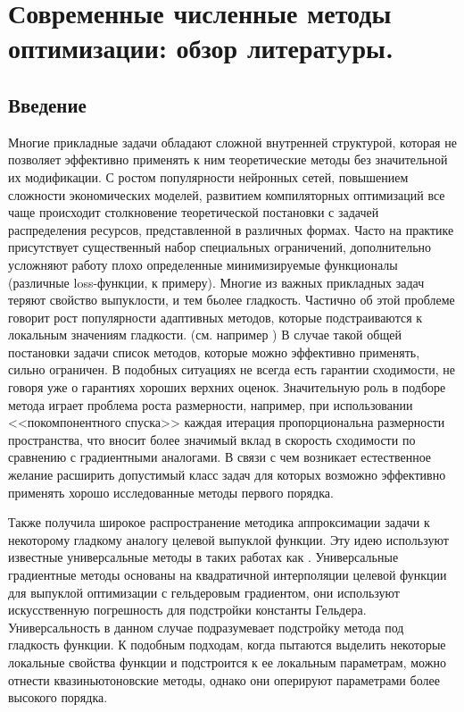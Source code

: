 \chapter{Современные численные методы оптимизации: обзор литератyры.}\label{ch:ch1}

\section{Введение}\label{sec:ch1/sec1}

  Многие прикладные задачи обладают сложной внутренней структурой, которая не позволяет эффективно применять к ним теоретические методы без значительной их модификации. С ростом популярности нейронных сетей, повышением сложности экономических моделей, развитием компиляторных оптимизаций все чаще происходит столкновение теоретической постановки с задачей распределения ресурсов, представленной в различных формах. Часто на практике присутствует существенный набор специальных ограничений, дополнительно усложняют работу плохо определенные минимизируемые функционалы (различные loss-функции, к примеру). Многие из важных прикладных задач теряют свойство выпуклости, и тем бьолее гладкость. Частично об этой проблеме говорит рост популярности адаптивных методов, которые подстраиваются к локальным значениям гладкости. (см. например \cite{o2015adaptive, AdaMirr_2021, UMP}) В случае такой общей постановки задачи список методов, которые можно эффективно применять, сильно ограничен. В подобных ситуациях не всегда есть гарантии сходимости, не говоря уже о гарантиях хороших верхних оценок. Значительную роль в подборе метода играет проблема роста размерности, например, при использовании <<покомпонентного спуска>> каждая итерация пропорциональна размерности пространства, что вносит более значимый вклад в скорость сходимости по сравнению с градиентными аналогами. В связи с чем возникает естественное желание расширить допустимый класс задач для которых возможно эффективно применять хорошо исследованные методы первого порядка. 

  Также получила широкое распространение методика аппроксимации задачи к некоторому гладкому аналогу целевой выпуклой функции. Эту идею используют известные универсальные методы в таких работах как \cite{gasnikov2017universal, guminov2019universal}. Универсальные градиентные методы основаны на квадратичной интерполяции целевой функции для выпуклой оптимизации с гельдеровым градиентом, они используют искусственную погрешность для подстройки константы Гельдера. Универсальность в данном случае подразумевает подстройку метода под гладкость функции. К подобным подходам, когда пытаются выделить некоторые локальные свойства функции и подстроится к ее локальным параметрам, можно отнести квазиньютоновские методы, однако они оперируют параметрами более высокого порядка. 

